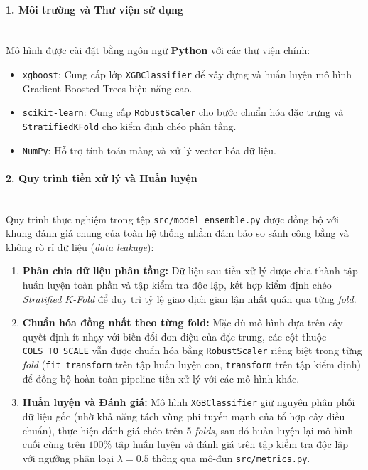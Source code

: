 \paragraph{1. Môi trường và Thư viện sử dụng}\mbox{}\\
Mô hình được cài đặt bằng ngôn ngữ \textbf{Python} với các thư viện chính:
\begin{itemize}
    \item \texttt{xgboost}: Cung cấp lớp \texttt{XGBClassifier} để xây dựng và huấn luyện mô hình Gradient Boosted Trees hiệu năng cao.
    \item \texttt{scikit-learn}: Cung cấp \texttt{RobustScaler} cho bước chuẩn hóa đặc trưng và \texttt{StratifiedKFold} cho kiểm định chéo phân tầng.
    \item \texttt{NumPy}: Hỗ trợ tính toán mảng và xử lý vector hóa dữ liệu.
\end{itemize}

\paragraph{2. Quy trình tiền xử lý và Huấn luyện}\mbox{}\\
Quy trình thực nghiệm trong tệp \texttt{src/model\_ensemble.py} được đồng bộ với khung đánh giá chung của toàn hệ thống nhằm đảm bảo so sánh công bằng và không rò rỉ dữ liệu (\textit{data leakage}):
\begin{enumerate}
    \item \textbf{Phân chia dữ liệu phân tầng:} Dữ liệu sau tiền xử lý được chia thành tập huấn luyện toàn phần và tập kiểm tra độc lập, kết hợp kiểm định chéo \textit{Stratified K-Fold} để duy trì tỷ lệ giao dịch gian lận nhất quán qua từng \textit{fold}.
    \item \textbf{Chuẩn hóa đồng nhất theo từng fold:} Mặc dù mô hình dựa trên cây quyết định ít nhạy với biến đổi đơn điệu của đặc trưng, các cột thuộc \texttt{COLS\_TO\_SCALE} vẫn được chuẩn hóa bằng \texttt{RobustScaler} riêng biệt trong từng \textit{fold} (\texttt{fit\_transform} trên tập huấn luyện con, \texttt{transform} trên tập kiểm định) để đồng bộ hoàn toàn pipeline tiền xử lý với các mô hình khác.
    \item \textbf{Huấn luyện và Đánh giá:} Mô hình \texttt{XGBClassifier} giữ nguyên phân phối dữ liệu gốc (nhờ khả năng tách vùng phi tuyến mạnh của tổ hợp cây điều chuẩn), thực hiện đánh giá chéo trên 5 \textit{folds}, sau đó huấn luyện lại mô hình cuối cùng trên $100\%$ tập huấn luyện và đánh giá trên tập kiểm tra độc lập với ngưỡng phân loại $\lambda = 0.5$ thông qua mô-đun \texttt{src/metrics.py}.
\end{enumerate}

